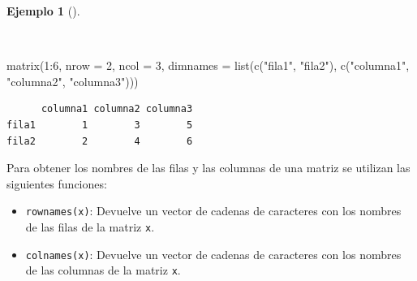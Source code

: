 \documentclass[
  spanish,
  a4paper,
]{scrreport}
\newenvironment{Shaded}{\begin{snugshade}}{\end{snugshade}}
\newcommand{\AttributeTok}[1]{\textcolor[rgb]{0.40,0.45,0.13}{#1}}
\newcommand{\DecValTok}[1]{\textcolor[rgb]{0.68,0.00,0.00}{#1}}
\newcommand{\FunctionTok}[1]{\textcolor[rgb]{0.28,0.35,0.67}{#1}}
\newcommand{\NormalTok}[1]{\textcolor[rgb]{0.00,0.23,0.31}{#1}}
\newcommand{\SpecialCharTok}[1]{\textcolor[rgb]{0.37,0.37,0.37}{#1}}
\newcommand{\StringTok}[1]{\textcolor[rgb]{0.13,0.47,0.30}{#1}}
\providecommand{\tightlist}{%
  \setlength{\itemsep}{0pt}\setlength{\parskip}{0pt}}
\theoremstyle{definition}
\theoremstyle{definition}
\newtheorem{example}{Ejemplo}[chapter]
\theoremstyle{remark}
\begin{document}
\begin{example}[]\protect\hypertarget{exm-creacion-matrices-con-nombres}{}\label{exm-creacion-matrices-con-nombres}

~

\begin{Shaded}
\begin{Highlighting}[]
\FunctionTok{matrix}\NormalTok{(}\DecValTok{1}\SpecialCharTok{:}\DecValTok{6}\NormalTok{, }\AttributeTok{nrow =} \DecValTok{2}\NormalTok{, }\AttributeTok{ncol =} \DecValTok{3}\NormalTok{, }\AttributeTok{dimnames =} \FunctionTok{list}\NormalTok{(}\FunctionTok{c}\NormalTok{(}\StringTok{"fila1"}\NormalTok{, }\StringTok{"fila2"}\NormalTok{), }\FunctionTok{c}\NormalTok{(}\StringTok{"columna1"}\NormalTok{, }\StringTok{"columna2"}\NormalTok{, }\StringTok{"columna3"}\NormalTok{)))}
\end{Highlighting}
\end{Shaded}

\begin{verbatim}
      columna1 columna2 columna3
fila1        1        3        5
fila2        2        4        6
\end{verbatim}

\end{example}

Para obtener los nombres de las filas y las columnas de una matriz se
utilizan las siguientes funciones:

\begin{itemize}
\tightlist
\item
  \texttt{rownames(x)}: Devuelve un vector de cadenas de caracteres con
  los nombres de las filas de la matriz \texttt{x}.
\item
  \texttt{colnames(x)}: Devuelve un vector de cadenas de caracteres con
  los nombres de las columnas de la matriz \texttt{x}.
\end{itemize}
\end{document}
